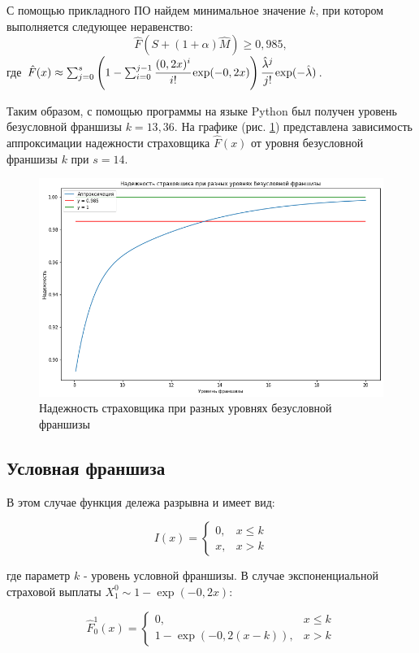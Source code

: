 \documentclass[a4paper,12pt]{article}
\begin{document}
С помощью прикладного ПО найдем минимальное значение $k$, при котором выполняется следующее неравенство:
\[\hat{F}(S + (1 + \alpha)\hat{M}) \ge 0,985,\]
где $\hat{F}(x) \approx \sum_{j = 0}^{s} \left(1 - \sum_{i = 0}^{j - 1} \cfrac{(0,2 x)^i}{i!} \exp(-0,2x)\right) \cfrac{\hat{\lambda}^j}{j!}\exp (-\hat{\lambda})$.

Таким образом, с помощью программы на языке Python был получен уровень безусловной франшизы $k=13,36$. На графике (рис. \ref{fig:graph1}) представлена зависимость аппроксимации надежности страховщика $\hat{F}(x)$ от уровня безусловной франшизы $k$ при $s = 14$.

\begin{figure}[H]
	\centering
	\includegraphics[width=0.9\linewidth]{graph1}
	\caption{Надежность страховщика при разных уровнях безусловной франшизы}
	\label{fig:graph1}
\end{figure}

\subsection{Условная франшиза}

В этом случае функция дележа разрывна и имеет вид: 

$$I(x) = 
	\begin{cases}
		0, &x \le k\\
		x, &x > k
	\end{cases}$$

где параметр $k$ - уровень условной франшизы. В случае экспоненциальной страховой выплаты $X_1^0 \sim 1-\exp(-0,2x)$:

$$\hat{F}_0^1(x) = 
\begin{cases}
	0, &x \le k\\
	1-\exp(-0,2(x-k)), &x > k
\end{cases}$$
\end{document}
